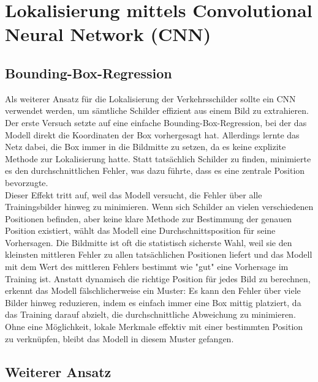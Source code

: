 \documentclass[runningheads]{llncs}
\begin{document}
\section{Lokalisierung mittels Convolutional Neural Network (CNN)}

\subsection{Bounding-Box-Regression}
Als weiterer Ansatz für die Lokalisierung der Verkehrsschilder sollte ein CNN verwendet
werden, um sämtliche Schilder effizient aus einem Bild zu extrahieren.
Der erste Versuch setzte auf eine einfache Bounding-Box-Regression, bei der das Modell
direkt die Koordinaten der Box vorhergesagt hat. Allerdings lernte das Netz dabei, die
Box immer in die Bildmitte zu setzen, da es keine explizite Methode zur Lokalisierung hatte. Statt tatsächlich Schilder zu finden, minimierte es den durchschnittlichen Fehler, was dazu führte, dass es eine zentrale Position bevorzugte.
\\
Dieser Effekt tritt auf, weil das Modell versucht, die Fehler über alle Trainingsbilder
hinweg zu minimieren. Wenn sich Schilder an vielen verschiedenen Positionen befinden,
aber keine klare Methode zur Bestimmung der genauen Position existiert, wählt das
Modell eine Durchschnittsposition für seine Vorhersagen. Die Bildmitte ist oft die
statistisch sicherste Wahl, weil sie den kleinsten mittleren Fehler zu allen tatsächlichen
Positionen liefert und das Modell mit dem Wert des mittleren Fehlers bestimmt wie "gut"
eine Vorhersage im Training ist. Anstatt dynamisch die richtige Position für jedes Bild
zu berechnen,
erkennt das Modell fälschlicherweise ein Muster:
Es kann den Fehler über viele Bilder hinweg reduzieren, indem es einfach immer eine
Box mittig platziert, da das Training darauf abzielt, die durchschnittliche
Abweichung zu minimieren. Ohne eine Möglichkeit, lokale Merkmale effektiv mit einer
bestimmten Position zu verknüpfen, bleibt das Modell
in diesem Muster gefangen.

\subsection{Weiterer Ansatz}
\end{document}
